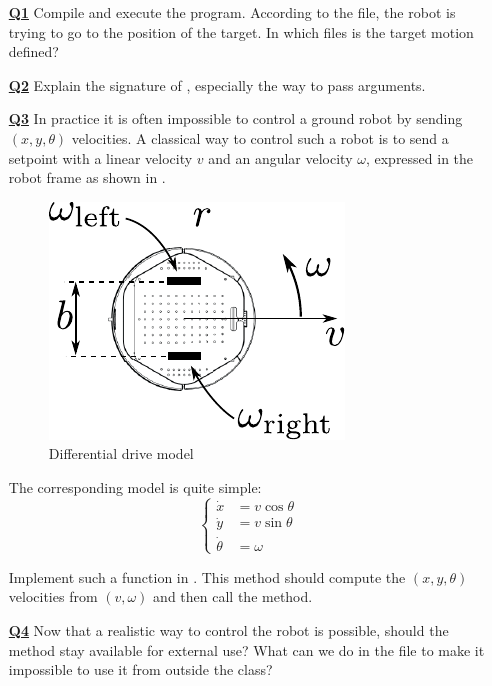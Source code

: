 \documentclass{ecnreport}
\begin{document}
\begin{itemize}
\medskip\item[\textbf{\underline{Q1}}]  Compile and execute the program. According to the  file, the robot is trying to go to the position of the target. In which files is the target motion defined?

\medskip\item[\textbf{\underline{Q2}}] Explain the signature of   , especially the way to pass arguments.

\medskip\item[\textbf{\underline{Q3}}] In practice it is often impossible to control a ground robot by sending $(x,y,\theta)$ velocities. A classical way to control such a robot is to send a setpoint with a linear velocity $v$ and an angular velocity $\omega$, expressed in the robot frame as shown in .

\begin{figure}[h!]\centering
\includegraphics[width=.3\linewidth]{wheels}
\caption{\label{fig:dd} Differential drive model}
\end{figure}

The corresponding model is quite simple:
\begin{equation*}
\left\{\begin{array}{ll}
\dot x &= v\cos \theta \\
\dot y &= v\sin \theta \\
\dot \theta &= \omega
\end{array}\right.
\end{equation*}

Implement such a function in . This method should compute the $(x,y,\theta)$ velocities from $(v,\omega)$ and then call the  method. 

\medskip\item[\textbf{\underline{Q4}}] Now that a realistic way to control the robot is possible, should the  method stay available for external use? What can we do in the  file to make it impossible to use it from outside the  class?


\end{itemize}
\end{document}
